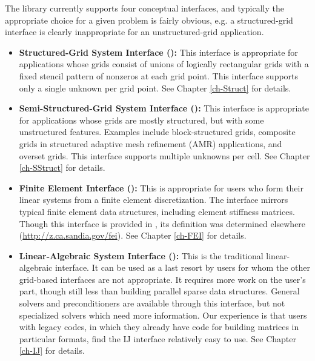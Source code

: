 The \hypre{} library currently supports four conceptual interfaces,
and typically the appropriate choice for a given problem is fairly
obvious, e.g. a structured-grid interface is clearly inappropriate for
an unstructured-grid application.


\begin{itemize}

\item
{\bf Structured-Grid System Interface ():} This interface is
appropriate for applications whose grids consist of unions of logically
rectangular grids with a fixed stencil pattern of nonzeros at each grid point.
This interface supports only a single unknown per grid point.  See Chapter
\ref{ch-Struct} for details.

\item
{\bf Semi-Structured-Grid System Interface ():} This
interface is appropriate for applications whose grids are mostly
structured, but with some unstructured features.  Examples include
block-structured grids, composite grids in structured adaptive mesh
refinement (AMR) applications, and overset grids.  This interface
supports multiple unknowns per cell. See Chapter \ref{ch-SStruct} for details.

\item
{\bf Finite Element Interface ():} This is appropriate for
users who form their linear systems from a finite element
discretization.  The interface mirrors typical finite element data
structures, including element stiffness matrices.  Though this
interface is provided in \hypre{}, its definition was determined
elsewhere (\url{http://z.ca.sandia.gov/fei}). See Chapter \ref{ch-FEI}
for details.

\item
{\bf Linear-Algebraic System Interface ():} This is the
traditional linear-algebraic interface.  It can be used as a last
resort by users for whom the other grid-based interfaces are not
appropriate.  It requires more work on the user's part, though still
less than building parallel sparse data structures.  General solvers
and preconditioners are available through this interface, but not
specialized solvers which need more information.  Our experience is
that users with legacy codes, in which they already have code for
building matrices in particular formats, find the IJ interface
relatively easy to use. See Chapter \ref{ch-IJ} for details.

\end{itemize}


